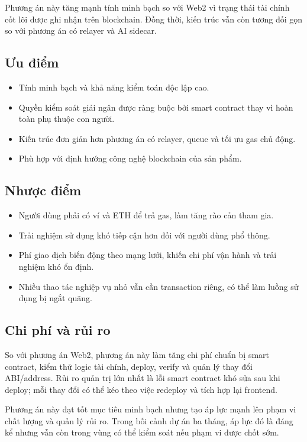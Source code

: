 Phương án này tăng mạnh tính minh bạch so với Web2 vì trạng thái tài chính cốt lõi được ghi nhận trên blockchain. Đồng thời, kiến trúc vẫn còn tương đối gọn so với phương án có relayer và AI sidecar.

\subsection{Ưu điểm}

\begin{itemize}
  \item Tính minh bạch và khả năng kiểm toán độc lập cao.
  \item Quyền kiểm soát giải ngân được ràng buộc bởi smart contract thay vì hoàn toàn phụ thuộc con người.
  \item Kiến trúc đơn giản hơn phương án có relayer, queue và tối ưu gas chủ động.
  \item Phù hợp với định hướng công nghệ blockchain của sản phẩm.
\end{itemize}

\subsection{Nhược điểm}

\begin{itemize}
  \item Người dùng phải có ví và ETH để trả gas, làm tăng rào cản tham gia.
  \item Trải nghiệm sử dụng khó tiếp cận hơn đối với người dùng phổ thông.
  \item Phí giao dịch biến động theo mạng lưới, khiến chi phí vận hành và trải nghiệm khó ổn định.
  \item Nhiều thao tác nghiệp vụ nhỏ vẫn cần transaction riêng, có thể làm luồng sử dụng bị ngắt quãng.
\end{itemize}

\subsection{Chi phí và rủi ro}

So với phương án Web2, phương án này làm tăng chi phí chuẩn bị smart contract, kiểm thử logic tài chính, deploy, verify và quản lý thay đổi ABI/address. Rủi ro quản trị lớn nhất là lỗi smart contract khó sửa sau khi deploy; mỗi thay đổi có thể kéo theo việc redeploy và tích hợp lại frontend.

Phương án này đạt tốt mục tiêu minh bạch nhưng tạo áp lực mạnh lên phạm vi chất lượng và quản lý rủi ro. Trong bối cảnh dự án ba tháng, áp lực đó là đáng kể nhưng vẫn còn trong vùng có thể kiểm soát nếu phạm vi được chốt sớm.

